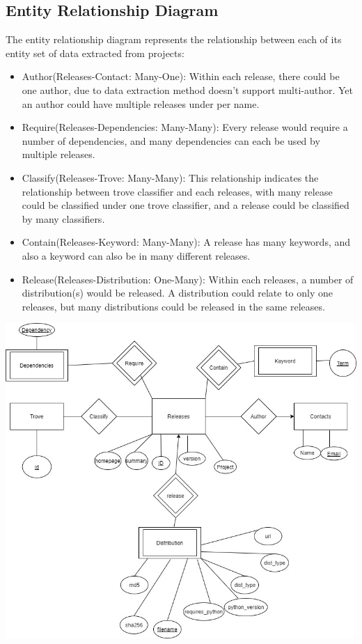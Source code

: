 \documentclass[a4paper,12pt]{article}
\begin{document}
\subsection{Entity Relationship Diagram}
The entity relationship diagram represents the relationship between each of
its entity set of data extracted from projects:
\begin{itemize}
  \item Author(Releases-Contact: Many-One): Within each release, there could be
    one author, due to data extraction method doesn't support multi-author.
    Yet an author could have multiple releases under per name.
  \item Require(Releases-Dependencies: Many-Many): Every release would require
    a number of dependencies, and many dependencies can each be used by
    multiple releases.
  \item Classify(Releases-Trove: Many-Many): This relationship indicates the
    relationship between trove classifier and each releases, with many release
    could be classified under one trove classifier, and a release could be
    classified by many classifiers.
  \item Contain(Releases-Keyword: Many-Many): A release has many keywords,
    and also a keyword can also be in many different releases.
  \item Release(Releases-Distribution: One-Many): Within each releases,
    a number of distribution(s) would be released.  A distribution could
    relate to only one releases, but many distributions could be released
    in the same releases.
\end{itemize}
\includegraphics[width=\textwidth]{erd.png}
\end{document}
